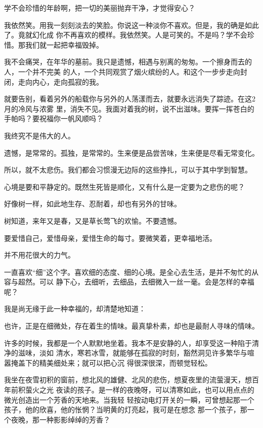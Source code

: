 		学不会珍惜的年龄啊，把一切的美丽抛弃干净，才觉得安心？

		我依然笑。用我一刻刻淡去的笑脸。你说这一种淡你不喜欢。但是，我的确是如此了。竟就幻化成
	你不再喜欢的模样。我依然笑。人是可笑的。不是吗？学不会珍惜。那我们就一起把幸福毁掉。

		我不会痛哭，在年华的墓前。我只是遗憾，相遇与别离的匆匆。一个擦身而去的人，一个并不完美
	的人，一个共同观赏了烟火缤纷的人。和这个一步步走向封闭，走向内心，走向孤寂的我。

		就要告别，看着另外的船载你与另外的人荡漾而去，就要永远消失了踪迹。在这2月的冷风与浓雾
	里，消失不见。我面对着我的树，说不出滋味。要挥一挥苍白的手帕吗？要祝福你一帆风顺吗？

		我终究不是伟大的人。

		遗憾，是常常的。孤独，是常常的。生来便是品尝苦味，生来便是尽看无常变化。

		所以，就不太悲伤。我们都会习惯漫无边际的这些挣扎，可以于其中学到智慧。

		心境是要和平静定的。既然生死皆是顺化，又有什么是一定要为之悲伤的呢？

		好像树一样，如此地生存、忍耐着，却也有另外的甘味。

		树知道，来年又是春，又是草长莺飞的欢愉。不要遗憾。

		要爱惜自己，爱惜母亲，爱惜生命的每寸。要微笑着，更幸福地活。

		并不用花很大的力气。

	\endwriting



		一直喜欢“细”这个字。喜欢细的态度、细的心境。是全心去生活，是并不匆忙的从容与超然。可以
	静下心，去细听，去细品，去细微入一丝一毫。会是怎样的幸福呢？

		我是尚无缘于此一种幸福的，却清楚地知道：

		也许，正是在细微处，存在着生的情味。最真挚朴素，却也是最耐人寻味的情味。

		许多的时候，我都是一个人默默地坐着。我本不是安静的人，却享受这一种陷于清净的滋味，淡如
	清水，寒若冰雪，就能够在孤寂的时刻，豁然洞见许多繁华与喧嚣掩盖下的精美细处来；就可以把心沉
	得很深很深，而顿觉轻松。

		我坐在夜雪初积的窗前，想北风的雄健、北风的悲伤，想夏夜里的流萤漫天，想百年前积萤火之光
	夜读的孩子。是一样的夜晚呀，可以清寒如此，也可以用点点的微光创造出一个芳香的天地来。当我轻
	轻按动电灯开关的一瞬，可曾想起那一个孩子，他的欣喜，他的怅惘？当明黄的灯亮起，我可是在想念
	那一个孩子，那一个夜晚，那一种影影绰绰的芳香？


